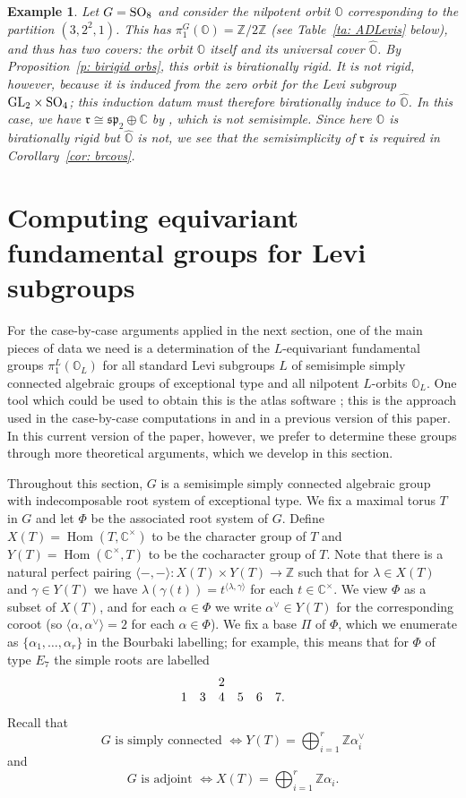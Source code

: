 \documentclass[11pt]{amsart}
\newcommand{\C}{{\mathbb C}}
\renewcommand{\O}{{\mathbb O}}
\newcommand{\bZ}{{\mathbb Z}}
\renewcommand{\sp}{{\mathfrak s}{\mathfrak p}}
\renewcommand{\r}{{\mathfrak r}}
\newcommand{\Hom}{\operatorname{Hom}}
\newcommand{\GL}{{{\mbox{\rm GL}}}}
\newcommand{\SO}{{{\mbox{\rm SO}}}}
\newcommand{\hatO}{\widehat{\O}}
\newtheorem{exa}{Example}
\numberwithin{equation}{section}
\begin{document}
	\begin{exa}
		Let $G=\SO_8$ and consider the nilpotent orbit $\O$ corresponding to the partition $(3,2^2,1)$. This has $\pi_1^G(\O)=\bZ/2\bZ$ (see Table~\ref{ta: ADLevis} below), and thus has two covers: the orbit $\O$ itself and its universal cover $\hatO$. By Proposition~\ref{p: birigid orbs}, this orbit is birationally rigid. It is not rigid, however, because it is induced from the zero orbit for the Levi subgroup $\GL_2\times\SO_4$; this induction datum must therefore birationally induce to $\hatO$. In this case, we have $\r\cong \sp_2\oplus \C$ by \cite[Theorem 6.1.3]{CM}, which is not semisimple. Since here $\O$ is birationally rigid but $\hatO$ is not, we see that the semisimplicity of $\r$ is required in Corollary~\ref{cor: brcovs}.
	\end{exa}
	
	\section{Computing equivariant fundamental groups for Levi subgroups}\label{s: CompGrps}
	
	For the case-by-case arguments applied in the next section, one of the main pieces of data we need is a determination of the $L$-equivariant fundamental groups $\pi_1^L(\O_L)$ for all standard Levi subgroups $L$ of semisimple simply connected algebraic groups of exceptional type and all nilpotent $L$-orbits $\O_L$. One tool which could be used to obtain this is the {\selectfont atlas} software \cite{At}; this is the approach used in the case-by-case computations in \cite{MM} and in a previous version of this paper. In this current version of the paper, however, we prefer to determine these groups through more theoretical arguments, which we develop in this section. 
	
	Throughout this section, $G$ is a semisimple simply connected algebraic group with indecomposable root system of exceptional type. We fix a maximal torus $T$ in $G$ and let $\Phi$ be the associated root system of $G$. Define $X(T)=\Hom(T,\C^\times)$ to be the character group of $T$ and $Y(T)=\Hom(\C^\times,T)$ to be the cocharacter group of $T$. Note that there is a natural perfect pairing $\langle -, -\rangle: X(T)\times Y(T)\to \bZ$ such that for $\lambda\in X(T)$ and $\gamma\in Y(T)$ we have $\lambda(\gamma(t))=t^{\langle \lambda,\gamma\rangle}$ for each $t\in\C^\times$. We view $\Phi$ as a subset of $X(T)$, and for each $\alpha\in \Phi$ we write $\alpha^\vee\in Y(T)$ for the corresponding coroot (so $\langle \alpha,\alpha^\vee\rangle=2$ for each $\alpha\in\Phi$).  We fix a base $\Pi$ of $\Phi$, which we enumerate as $\{\alpha_1,\ldots,\alpha_r\}$ in the Bourbaki labelling; for example, this means that for $\Phi$ of type $E_7$ the simple roots are labelled
	$$\begin{array}{c c c c c c}
		& & 2 & & & \\
		1 & 3 & 4 & 5 & 6 & 7. \\
	\end{array}$$
	Recall that $$G \mbox{ is simply connected }\iff Y(T)=\bigoplus_{i=1}^{r} \bZ \alpha_i^\vee$$ and  $$G \mbox{ is adjoint } \iff  X(T)=\bigoplus_{i=1}^{r} \bZ \alpha_i.$$
	
\end{document}
